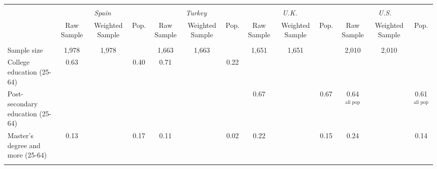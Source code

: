 \begin{tabular}{l*{12}{c}}
\toprule
\hline \\[-1.8ex]
\multicolumn{1}{c}{\em{ }} & \multicolumn{3}{c}{\em{Spain}} & \multicolumn{3}{c}{\em{Turkey}} & \multicolumn{3}{c}{\em{U.K.}} & \multicolumn{3}{c}{\em{U.S.}} \\
\cmidrule(l{3pt}r{3pt}){2-4} \cmidrule(l{3pt}r{3pt}){5-7} \cmidrule(l{3pt}r{3pt}){8-10} \cmidrule(l{3pt}r{3pt}){11-13}
\noalign{\smallskip}  & Raw Sample & Weighted Sample & Pop. & Raw Sample & Weighted Sample & Pop. & Raw Sample & Weighted Sample & Pop. & Raw Sample & Weighted Sample & Pop. \\
\hline \\[-1.8ex] 
Sample size & 1,978 & 1,978 & & 1,663 & 1,663 & & 1,651 & 1,651 & & 2,010 & 2,010 & \\
\noalign{\smallskip}\hline \noalign{\smallskip}
College education (25-64) & 0.63 & & 0.40 & 0.71 & & 0.22 & & & & & &  \\
Post-secondary education (25-64) & & & & & & & 0.67 & & 0.67 & 0.64$^\text{all pop}$ & & 0.61$^\text{all pop}$ \\
Master's degree and more (25-64) & 0.13 & & 0.17 & 0.11 & & 0.02 & 0.22 & & 0.15 & 0.24 & & 0.14 \\
\\
\bottomrule
\end{tabular}